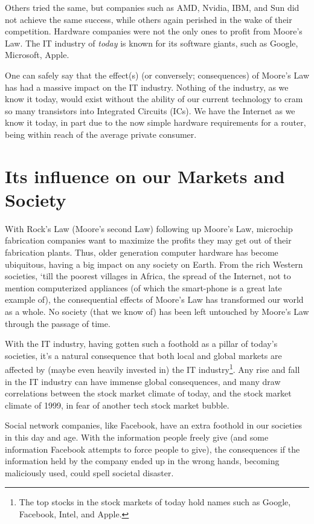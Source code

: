 \documentclass[a4paper,12pt]{article}
\begin{document}
Others tried the same, but companies such as AMD, Nvidia, IBM, and Sun did not achieve the same success, while others again perished in the wake of their competition.
Hardware companies were not the only ones to profit from Moore's Law.
The IT industry of \emph{today} is known for its software giants, such as Google, Microsoft, Apple.

One can safely say that the effect(s) (or conversely; consequences) of Moore's Law has had a massive impact on the IT industry.
Nothing of the industry, as we know it today, would exist without the ability of our current technology to cram so many transistors into Integrated Circuits (ICs).
We have the Internet as we know it today, in part due to the now simple hardware requirements for a router, being within reach of the average private consumer.

\section*{Its influence on our Markets and Society}

With Rock's Law (Moore's second Law) following up Moore's Law, microchip fabrication companies want to maximize the profits they may get out of their fabrication plants.
Thus, older generation computer hardware has become ubiquitous, having a big impact on any society on Earth.
From the rich Western societies, `till the poorest villages in Africa, the spread of the Internet, not to mention computerized appliances (of which the smart-phone is a great late example of), the consequential effects of Moore's Law has transformed our world as a whole.
No society (that we know of) has been left untouched by Moore's Law through the passage of time.

With the IT industry, having gotten such a foothold as a pillar of today's societies, it's a natural consequence that both local and global markets are affected by (maybe even heavily invested in) the IT industry\footnote{The top stocks in the stock markets of today hold names such as Google, Facebook, Intel, and Apple\cite{ITstockMarkets}.}.
Any rise and fall in the IT industry can have immense global consequences, and many draw correlations between the stock market climate of today, and the stock market climate of 1999, in fear of another tech stock market bubble\cite{TechBubbleBursting}.

Social network companies, like Facebook, have an extra foothold\cite{FacebookInternetAfrica} in our societies in this day and age.
With the information people freely give (and some information Facebook attempts to force people to give\cite{FacebookRealNamePolicyConsequences}), the consequences if the information held by the company ended up in the wrong hands, becoming maliciously used, could spell societal disaster.
\end{document}
